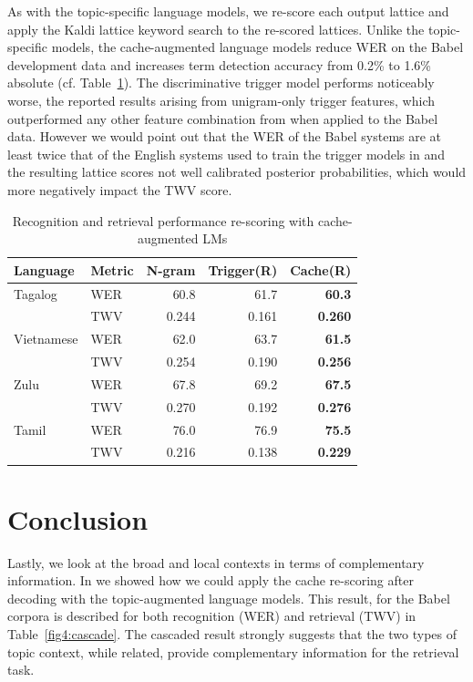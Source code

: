 As with the topic-specific language models, we re-score each output lattice and apply the Kaldi lattice keyword search to the re-scored lattices.  Unlike the topic-specific models, the cache-augmented language models reduce WER on the Babel development data and increases term detection accuracy from 0.2\% to 1.6\% absolute (cf. Table~\ref{fig4:cachelms}).  The discriminative trigger model performs noticeably worse, the reported results arising from unigram-only trigger features, which outperformed any other feature combination from \cite{singh2007trigger} when applied to the Babel data.  However we would point out that the WER of the Babel systems are at least twice that of the English systems used to train the trigger models in \cite{singh2007trigger} and the resulting lattice scores not well calibrated posterior probabilities, which would more negatively impact the TWV score.

\begin{table}
\centering
   \begin{tabular}{l|l|rrr} \toprule
   \bf Language & \bf Metric & \bf N-gram & \bf Trigger(R) & \bf Cache(R) \\ \midrule
Tagalog& WER & 60.8 & 61.7 & \textbf{60.3} \\
        & TWV & 0.244 & 0.161 & \textbf{0.260} \\ \midrule
Vietnamese &   WER & 62.0 & 63.7 & \textbf{61.5}  \\
        & TWV & 0.254 & 0.190 & \textbf{0.256} \\ \midrule
Zulu&   WER & 67.8 & 69.2 & \textbf{67.5} \\
        & TWV & 0.270 & 0.192 & \textbf{0.276} \\ \midrule
Tamil&   WER & 76.0 & 76.9 &  \textbf{75.5}  \\
        & TWV & 0.216 & 0.138 &\textbf{0.229} \\ \bottomrule
        \end{tabular}
\caption[Re-scoring with cache-augmented LMs]{Recognition and retrieval performance re-scoring with cache-augmented LMs  \label{fig4:cachelms}}
\end{table}

\section{Conclusion}

Lastly, we look at the broad and local contexts in terms of complementary information.  In \cite{wintrode2014slta} we showed how we could apply the cache re-scoring after decoding with the topic-augmented language models.  This result, for the Babel corpora is described for both recognition  (WER) and retrieval (TWV) in Table~\ref{fig4:cascade}.  The cascaded result strongly suggests that the two types of topic context, while related, provide complementary information for the retrieval task.

